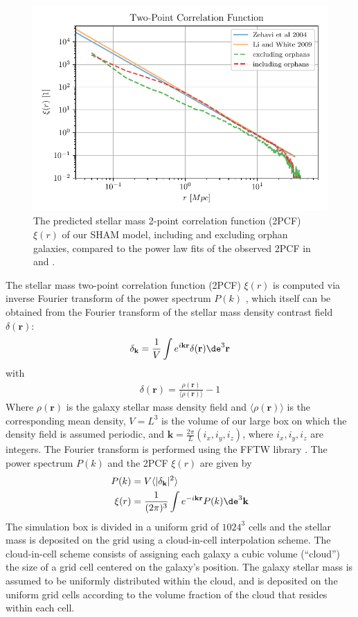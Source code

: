 \begin{figure}
  \centering
  \includegraphics[width=.7\linewidth, keepaspectratio]
	{figures/ACACIA/correlation.pdf}%
  \caption{The  predicted stellar  mass  2-point correlation  function
    (2PCF) $\xi(r)$ of our SHAM  model, including and excluding orphan
    galaxies, compared to  the power law fits of the  observed 2PCF in
    \citet{liDistributionStellarMass2009} and \citet{zehaviDeparturesPowerLaw2004}.
  }%
  \label{fig:correlations}
\end{figure}

The  stellar mass  two-point correlation  function (2PCF)  $\xi(r)$ is
computed via  inverse Fourier transform  of the power  spectrum $P(k)$
\citep[e.g.][]{moGalaxyFormationEvolution2010},
which itself  can  be obtained  from the  Fourier
transform    of   the    stellar   mass    density   contrast    field
$\delta(\mathbf{r})$:
%
\begin{align}
  \delta_\mathbf{k} = \frac{1}{V}\int e^{i\mathbf{kr}} \delta(\mathbf{r}) \de ^3 \mathbf{r}
\end{align}
%
with
%
\begin{align}
	\delta(\mathbf{r}) = \frac{\rho(\mathbf{r})}{\langle \rho(\mathbf{r}) \rangle } - 1
\end{align}
%
Where $\rho(\mathbf{r})$ is the galaxy  stellar mass density field and
$\langle \rho(\mathbf{r}) \rangle$ is  the corresponding mean density,
$V = L^3$ is the volume of our large box on which the density field is
assumed  periodic,  and  $\mathbf{k}=\frac{2\pi}{L}(i_x,  i_y,  i_z)$,
where  $i_x,  i_y,  i_z$  are  integers.   The  Fourier  transform  is
performed using  the FFTW library \citep{frigoDesignImplementationFFTW32005}.
The power spectrum $P(k)$ and the 2PCF $\xi(r)$ are given by
%
\begin{align}
  P(k)    &= V \langle |\delta_\mathbf{k}|^2 \rangle \\
  \xi(r)  &= \frac{1}{(2\pi)^3} \int e^{-i\mathbf{kr}} P(k) \de^3 \mathbf{k}
\end{align}
The simulation box is divided in  a uniform grid of $1024^3$ cells and
the  stellar mass  is  deposited  on the  grid  using a  cloud-in-cell
interpolation scheme.  The cloud-in-cell scheme consists  of assigning
each  galaxy a  cubic  volume  (``cloud'') the  size  of  a grid  cell
centered on the galaxy's position.  The galaxy stellar mass is assumed
to be uniformly distributed within the  cloud, and is deposited on the
uniform grid cells according to the  volume fraction of the cloud that
resides within each cell.

